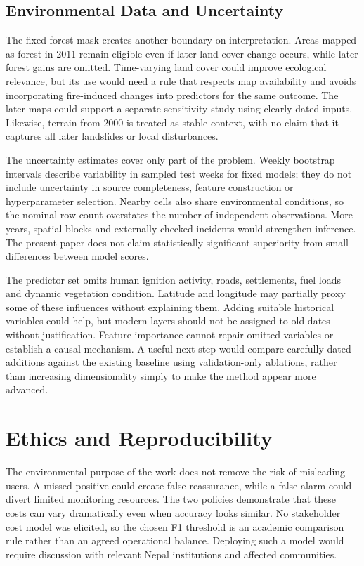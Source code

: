 \documentclass[conference,a4paper]{IEEEtran}
\begin{document}
\subsection{Environmental Data and Uncertainty}
The fixed forest mask creates another boundary on interpretation. Areas mapped as forest in 2011 remain eligible even if later land-cover change occurs, while later forest gains are omitted. Time-varying land cover could improve ecological relevance, but its use would need a rule that respects map availability and avoids incorporating fire-induced changes into predictors for the same outcome. The later maps could support a separate sensitivity study using clearly dated inputs. Likewise, terrain from 2000 is treated as stable context, with no claim that it captures all later landslides or local disturbances.

The uncertainty estimates cover only part of the problem. Weekly bootstrap intervals describe variability in sampled test weeks for fixed models; they do not include uncertainty in source completeness, feature construction or hyperparameter selection. Nearby cells also share environmental conditions, so the nominal row count overstates the number of independent observations. More years, spatial blocks and externally checked incidents would strengthen inference. The present paper does not claim statistically significant superiority from small differences between model scores.

The predictor set omits human ignition activity, roads, settlements, fuel loads and dynamic vegetation condition. Latitude and longitude may partially proxy some of these influences without explaining them. Adding suitable historical variables could help, but modern layers should not be assigned to old dates without justification. Feature importance cannot repair omitted variables or establish a causal mechanism. A useful next step would compare carefully dated additions against the existing baseline using validation-only ablations, rather than increasing dimensionality simply to make the method appear more advanced.

\section{Ethics and Reproducibility}
The environmental purpose of the work does not remove the risk of misleading users. A missed positive could create false reassurance, while a false alarm could divert limited monitoring resources. The two policies demonstrate that these costs can vary dramatically even when accuracy looks similar. No stakeholder cost model was elicited, so the chosen F1 threshold is an academic comparison rule rather than an agreed operational balance. Deploying such a model would require discussion with relevant Nepal institutions and affected communities.
\end{document}
